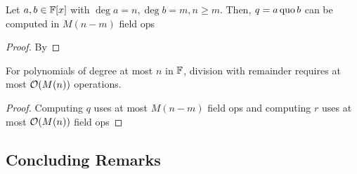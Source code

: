 \begin{corollary}{}{}
    Let $a, b \in \operatorname{\mathbb{F}}[x]$ with $\deg a = n, \deg b = m, n \geq m$. Then, $q = a \operatorname{quo} b$ can be computed in $M(n - m)$ field ops
\end{corollary}
\begin{proof}
    By 
\end{proof}

\begin{corollary}{}{}
    For polynomials of degree at most $n$ in $\operatorname{\mathbb{F}}$, division with remainder requires at most $\operatorname{\mathcal{O}}(M(n))$ operations.
\end{corollary}
\begin{proof}
    Computing $q$ uses at most $M(n - m)$ field ops and computing $r$ uses at most $\operatorname{\mathcal{O}}(M(n))$ field ops
\end{proof}

\subsection{Concluding Remarks}










